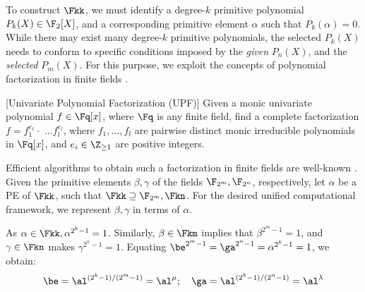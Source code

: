 \par To construct $\Fkk$, we must identify
a degree-$k$ primitive polynomial $P_{k}(X)\in\F_2[X]$, and a
corresponding primitive element $\alpha$ such that
$P_k(\alpha)=0$. While there may exist many degree-$k$ primitive
polynomials, the selected $P_k(X)$ needs to conform to specific
conditions imposed by the {\it given} $P_n(X)$, and
the {\it selected} $P_m(X)$.
For this purpose, we exploit the concepts of polynomial
factorization in finite fields \cite{factorization_fq:survey}. 



\begin{Problem}{[Univariate Polynomial Factorization (UPF)]}
Given a monic univariate polynomial $f \in \Fq[x]$, where $\Fq$ is
any finite field, find a complete factorization $f = f_1^{e_1}\cdot$ 
$\dots f_l^{e_l}$, where $f_1,\dots, f_l$ are pairwise
distinct monic irreducible polynomials in $\Fq[x]$, and
$e_i\in \Z_{\geq 1}$ are positive integers.
\end{Problem}

Efficient algorithms to obtain such a factorization in finite fields
are well-known \cite{factorization_fq:survey}. %
Given the primitive elements $\beta, \gamma$ of the fields 
$\F_{2^m},\F_{2^n}$, respectively, let $\alpha$ be a PE of $\Fkk$,
such that $\Fkk \supseteq \F_{2^m},\Fkn$. For the desired unified
computational framework, we represent $\beta, \gamma$ in terms
of $\alpha$. 

As $\alpha \in \Fkk, \alpha^{2^k-1}=1$. Similarly, $\beta\in \Fkm$
implies that $\beta^{2^{m}-1}=1$, and $\gamma\in\Fkn$ makes
$\gamma^{2^n-1}=1$. Equating $\be^{2^m-1}=\ga^{2^n-1}=\alpha^{2^k-1} =
1$, we obtain:
\vspace{-0.06in}
\begin{equation}
\label{word-level-rep}
 \be = \al^{(2^k-1)/(2^m-1)} = \al^{\mu};~~~
 \ga = \al^{(2^k-1)/(2^n-1)} = \al^{\lambda}
\end{equation}
\vspace{-0.2in}

